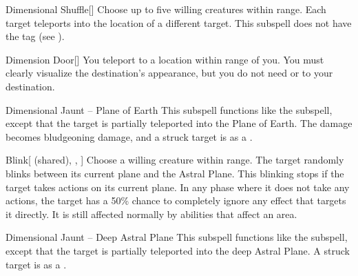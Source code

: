 \begin{ability}[\nth{2}]{Dimensional Shuffle}[]
Choose up to five willing creatures within \rngmed range.
Each target teleports into the location of a different target.
This subspell does not have the  tag (see ).
\end{ability}
\vspace{0.25em}


\begin{ability}[\nth{4}]{Dimension Door}[]
You teleport to a location within \rngext range of you.
You must clearly visualize the destination's appearance, but you do not need  or  to your destination.
\end{ability}
\vspace{0.25em}


\begin{ability}[\nth{4}]{Dimensional Jaunt -- Plane of Earth}
This subspell functions like the  subspell, except that the target is partially teleported into the Plane of Earth.
The damage becomes bludgeoning damage, and a struck target is  as a .
\end{ability}
\vspace{0.25em}


\begin{ability}[\nth{5}]{Blink}[ (shared), , ]
Choose a willing creature within \rngclose range.
The target randomly blinks between its current plane and the Astral Plane.
This blinking stops if the target takes actions on its current plane.
In any phase where it does not take any actions, the target has a 50\% chance to completely ignore any effect that targets it directly.
It is still affected normally by abilities that affect an area.
\end{ability}
\vspace{0.25em}


\begin{ability}[\nth{6}]{Dimensional Jaunt -- Deep Astral Plane}
This subspell functions like the  subspell, except that the target is partially teleported into the deep Astral Plane.
A struck target is  as a .
\end{ability}
\vspace{0.25em}



